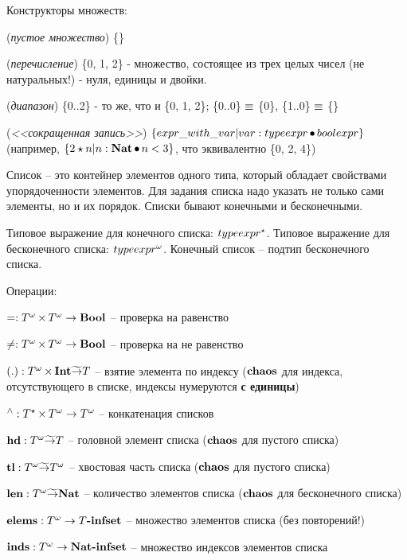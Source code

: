 Конструкторы множеств:
\begin{list}{}{}
\item (\emph{пустое множество}) \{\}
\item (\emph{перечисление}) \{0, 1, 2\} - множество, состоящее из трех целых чисел (не
натуральных!) - нуля, единицы и двойки.
\item (\emph{диапазон}) \{0..2\} -  то же, что и \{0, 1, 2\};
\{0..0\} $\mathop{\equiv}$ \{0\}, \{1..0\} $\mathop{\equiv}$ \{\}
\item (\emph{<<сокращенная запись>>}) $\{ expr\_with\_var | var : typeexpr
\mathop{\bullet} boolexpr\}$ (например, $\{2 \star n | n : \textbf{Nat} \mathop{\bullet} n < 3
\}$, что эквивалентно \{0, 2, 4\})
\end{list}

Список -- это контейнер элементов одного типа, который обладает свойствами упорядоченности элементов. Для задания списка надо указать не только сами элементы, но и их порядок. Списки бывают конечными и бесконечными.

Типовое выражение для конечного списка: $typeexpr^{\star}$. Типовое выражение для бесконечного списка: $typeexpr^{\omega}$. Конечный список -- подтип бесконечного списка.

Операции:
\begin{list}{}{}
\item $=: T^{\omega} \mathop{\times} T^{\omega} \rightarrow \textbf{Bool}$ -- проверка на равенство
\item $\neq: T^{\omega} \mathop{\times} T^{\omega} \rightarrow \textbf{Bool}$ -- проверка на не равенство
\item $(.) : T^{\omega} \mathop{\times} \textbf{Int} \widetilde{\rightarrow} T$ -- взятие элемента по
индексу ($\textbf{chaos}$ для индекса, отсутствующего в списке, индексы
нумеруются \textbf{с единицы})
\item $\mathop{{ }^\wedge}: T^{\star} \mathop{\times} T^{\omega} \rightarrow T^{\omega}$ -- конкатенация списков
\item $\mathop{\textbf{hd}}: T^{\omega} \widetilde{\rightarrow} T$ -- головной элемент списка ($\textbf{chaos}$ для пустого списка)
\item $\mathop{\textbf{tl}}: T^{\omega} \widetilde{\rightarrow} T^{\omega}$ -- хвостовая часть списка ($\textbf{chaos}$ для пустого списка)
\item $\mathop{\textbf{len}}: T^{\omega} \widetilde{\rightarrow} \textbf{Nat}$ -- количество элементов списка ($\textbf{chaos}$ для бесконечного списка)
\item $\mathop{\textbf{elems}}: T^{\omega} \rightarrow T\textbf{-infset}$ -- множество элементов списка (без повторений!)
\item $\mathop{\textbf{inds}}: T^{\omega} \rightarrow \textbf{Nat}\textbf{-infset}$ -- множество индексов элементов списка
\end{list}

